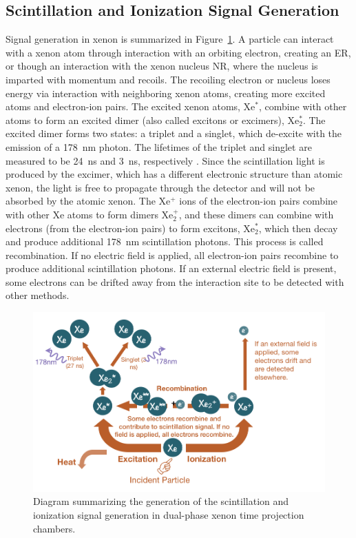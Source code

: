 \subsection{Scintillation and Ionization Signal Generation}
\label{sec:signal_generation}
Signal generation in xenon is summarized in Figure~\ref{fig:sig_gen}. A particle can interact with a xenon atom through interaction with an orbiting electron, creating an \ac{ER}, or though an interaction with the xenon nucleus \ac{NR}, where the nucleus is imparted with momentum and recoils. The recoiling electron or nucleus loses energy via interaction with neighboring xenon atoms, creating more excited atoms and electron-ion pairs. The excited xenon atoms, Xe$^{*}$, combine with other atoms to form an excited dimer (also called excitons or excimers), Xe$_{2}^{*}$. The excited dimer forms two states: a triplet and a singlet, which de-excite with the emission of a 178~nm photon. The lifetimes of the triplet and singlet are measured to be 24~ns and 3~ns, respectively \cite{Mock2014}. Since the scintillation light is produced by the excimer, which has a different electronic structure than atomic xenon, the light is free to propagate through the detector and will not be absorbed by the atomic xenon. The Xe$^{+}$ ions of the electron-ion pairs combine with other Xe atoms to form dimers Xe$_{2}^{+}$, and these dimers can combine with electrons (from the electron-ion pairs) to form excitons, Xe$_{2}^{*}$, which then decay and produce additional 178~nm scintillation photons. This process is called recombination. If no electric field is applied, all electron-ion pairs recombine to produce additional scintillation photons. If an external electric field is present, some electrons can be drifted away from the interaction site to be detected with other methods. 

\begin{figure}[htbp]
\begin{center}
\includegraphics[width=\textwidth]{figures/lxetpcs/signal_generation_in_lxe.png}
\caption{ Diagram summarizing the generation of the scintillation and ionization signal generation in dual-phase xenon time projection chambers.}
\label{fig:sig_gen}
\end{center}
\end{figure}

